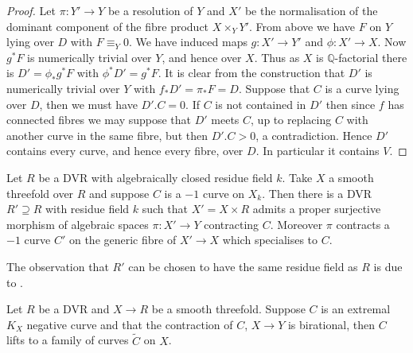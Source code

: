 	\begin{proof}
		
		Let $\pi \colon Y' \to Y$ be a resolution of $Y$ and $X'$ be the normalisation of the dominant component of the fibre product $X\times_{Y} Y'$. From above we have $F$ on $Y$ lying over $D$ with $F \equiv_{Y} 0$. We have induced maps $g\colon X' \to Y'$ and $\phi\colon  X' \to X$. Now $g^{*}F$ is numerically trivial over $Y$, and hence over $X$. Thus as $X$ is $\mathbb{Q}$-factorial there is $D'=\phi_{*}g^{*}F$ with $\phi^{*}D'=g^{*}F$. It is clear from the construction that $D'$ is numerically trivial over $Y$ with $f_{*}D'=\pi_{*}F=D$. Suppose that $C$ is a curve lying over $D$, then we must have $D'.C =0$. If $C$ is not contained in $D'$ then since $f$ has connected fibres we may suppose that $D'$ meets $C$, up to replacing $C$ with another curve in the same fibre, but then $D'.C > 0$, a contradiction. Hence $D'$ contains every curve, and hence every fibre, over $D$. In particular it contains $V$.		
	\end{proof}

	\begin{lemma}\cite[Lemma 9.4]{KU} \label{KU}
		Let $R$ be a DVR with algebraically closed residue field $k$. Take $X$ a smooth threefold over $R$ and suppose $C$ is a $-1$ curve on $X_{k}$. Then there is a DVR $R' \supseteq R$ with residue field $k$ such that $X'=X\times R$ admits a proper surjective morphism of algebraic spaces $\pi:X' \to Y$  contracting $C$. Moreover $\pi$ contracts a $-1$ curve $C'$ on the generic fibre of $X' \to X$ which specialises to $C$.
	\end{lemma}
	
	The observation that $R'$ can be chosen to have the same residue field as $R$ is due to \cite[Lemma 3.6]{egbert2016log}.
	
	\begin{theorem}\label{curves}
		Let $R$ be a DVR and $X \to R$ be a smooth threefold. Suppose $C$ is an extremal $K_{X}$ negative curve and that the contraction of $C$, $X\to Y$ is birational, then $C$ lifts to a family of curves $\tilde{C}$ on $X$. 
	\end{theorem}
	
